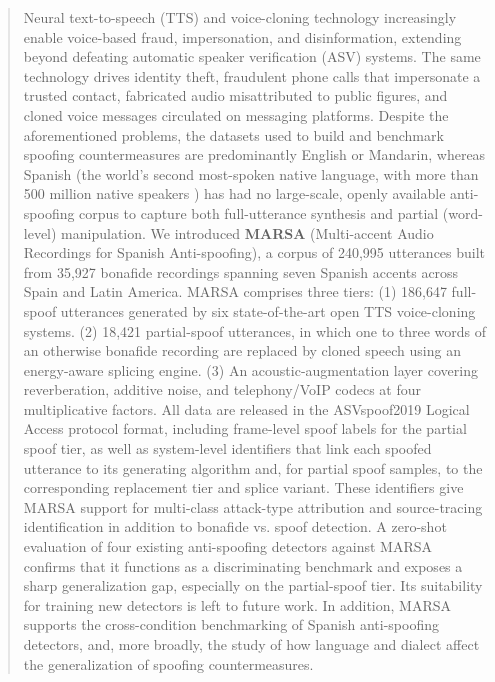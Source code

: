 \documentclass[11pt]{report}
\begin{document}
\begin{abstract}
\noindent
Neural text-to-speech (TTS) and voice-cloning technology increasingly
enable voice-based fraud, impersonation, and disinformation, extending
beyond defeating automatic speaker verification (ASV) systems. The
same technology drives identity theft, fraudulent phone calls that
impersonate a trusted contact, fabricated audio misattributed to public
figures, and cloned voice messages circulated on messaging platforms.
Despite the aforementioned problems, the datasets used to build and
benchmark spoofing countermeasures are predominantly English or
Mandarin, whereas Spanish (the world's second most-spoken native
language, with more than 500 million native speakers
\citep{cervantes2025espanol}) has had no
large-scale, openly available anti-spoofing corpus to capture both
full-utterance synthesis and partial (word-level) manipulation. We
introduced \textbf{MARSA} (Multi-accent Audio Recordings for Spanish
Anti-spoofing), a corpus of 240{,}995 utterances built from 35{,}927
bonafide recordings spanning seven Spanish accents across Spain and
Latin America. MARSA comprises three tiers: (1) 186{,}647 full-spoof
utterances generated by six state-of-the-art open TTS voice-cloning
systems. (2) 18{,}421 partial-spoof utterances, in which one to three
words of an otherwise bonafide recording are replaced by cloned speech
using an energy-aware splicing engine. (3) An acoustic-augmentation
layer covering reverberation, additive noise, and telephony/VoIP
codecs at four multiplicative factors. All data are released in the
ASVspoof2019 Logical Access protocol format, including frame-level
spoof labels for the partial spoof tier, as well as system-level
identifiers that link each spoofed utterance to its generating
algorithm and, for partial spoof samples, to the corresponding
replacement tier and splice variant. These identifiers give MARSA
support for multi-class attack-type attribution and source-tracing
identification in addition to bonafide vs. spoof detection. A zero-shot
evaluation of four existing anti-spoofing detectors against MARSA
confirms that it functions as a discriminating benchmark and exposes a
sharp generalization gap, especially on the partial-spoof tier. Its
suitability for training new detectors is left to future work. In
addition, MARSA supports
the cross-condition benchmarking of Spanish anti-spoofing detectors,
and, more broadly, the study of how language and dialect affect the
generalization of spoofing countermeasures.
\end{abstract}
\end{document}
